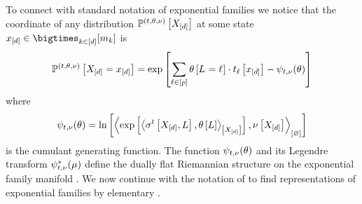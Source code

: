 To connect with standard notation of exponential families we notice that the coordinate of any distribution $\mathbb{P}^{(t,\theta,\nu)}\left[X_{[d]}\right]$ at some state $\shortcatindicesin$ is
\begin{align*}
    \mathbb{P}^{(t,\theta,\nu)}\left[X_{[d]}=x_{[d]}\right]
    = \mathrm{exp}\left[\sum_{\ell\in[p]}\theta\left[L_{}=\ell_{}\right]\cdot t_{\ell}\left[x_{[d]}\right] - \psi_{t,\nu}(\theta)\right]
\end{align*}
where
\begin{align*}
    \psi_{t,\nu}(\theta)
    = \ln \left[ \left\langle \mathrm{exp}\left[\left\langle \sigma^{t}\left[X_{[d]},L\right],\theta\left[L\right]\right\rangle_{\left[ X_{[d]} \right]}\right],\nu\left[X_{[d]}\right]\right\rangle_{\left[ \varnothing \right]} \right]
\end{align*}
is the cumulant generating function.
The function $\psi_{t,\nu}(\theta)$ and its Legendre transform $\psi^*_{t,\nu}(\mu)$ define the dually flat Riemannian structure on the exponential family manifold \cite{amari_information_2016}.
%
We now continue with the notation of  to find representations of exponential families by elementary \ComputationActivationNetworks{}.



